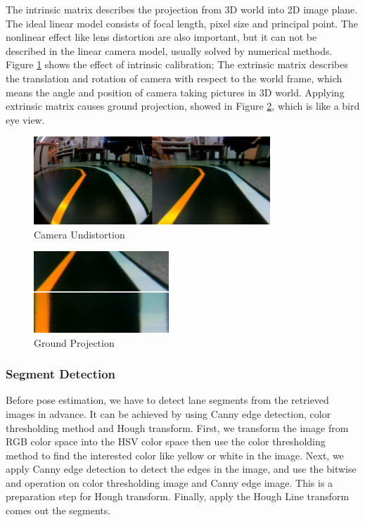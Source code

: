 \documentclass[conference]{IEEEtran}
\begin{document}
The intrinsic matrix describes the projection from 3D world into 2D image plane. The ideal linear model consists of focal length, pixel size and principal point. The nonlinear effect like lens distortion are also important, but it can not be described in the linear camera model, usually solved by numerical methods. Figure \ref{fig:intrinsic} shows the effect of intrinsic calibration; The extrinsic matrix describes the translation and rotation of camera with respect to the world frame, which means the angle and position of camera taking pictures in 3D world. Applying extrinsic matrix causes ground projection, showed in Figure \ref{fig:extrinsic}, which is like a bird eye view.

\begin{figure}
	\centering
	\includegraphics[width=3.5in]{img/intrinsic.png}
	\caption{Camera Undistortion}
	\label{fig:intrinsic}
\end{figure}

\begin{figure}	
	\centering
	\includegraphics[width=2in]{img/extrinsic.png}
	\caption{Ground Projection}
	\label{fig:extrinsic}
\end{figure}

\subsubsection{Segment Detection}

Before pose estimation, we have to detect lane segments from the retrieved images in advance. It can be achieved by using Canny edge detection, color thresholding method and Hough transform. First, we transform the image from RGB color space into the HSV color space then use the color thresholding method to find the interested color like yellow or white in the image. Next, we apply Canny edge detection to detect the edges in the image, and use the bitwise and operation on color thresholding image and Canny edge image. This is a preparation step for Hough transform. Finally, apply the Hough Line transform comes out the segments.
 
\end{document}
